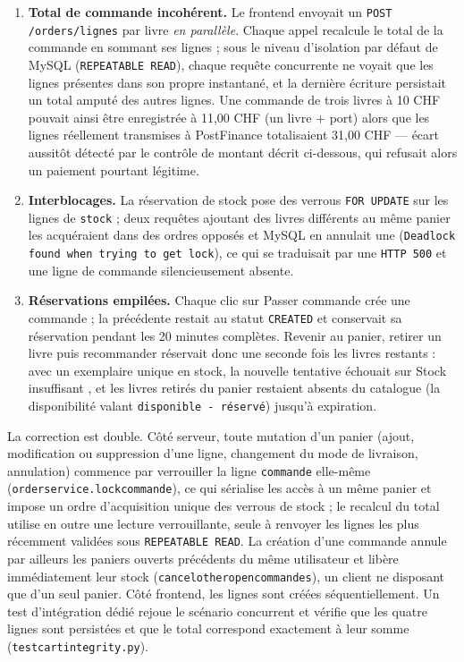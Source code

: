 \documentclass[12pt, a4paper]{report}
\renewcommand{\_}{\origunderscore\allowbreak}
\begin{document}
\begin{enumerate}
  \item \textbf{Total de commande incohérent.} Le frontend envoyait un \texttt{POST /orders/lignes} par livre \emph{en parallèle}. Chaque appel recalcule le total de la commande en sommant ses lignes ; sous le niveau d'isolation par défaut de MySQL (\texttt{REPEATABLE READ}), chaque requête concurrente ne voyait que les lignes présentes dans son propre instantané, et la dernière écriture persistait un total amputé des autres lignes. Une commande de trois livres à 10 CHF pouvait ainsi être enregistrée à 11,00 CHF (un livre + port) alors que les lignes réellement transmises à PostFinance totalisaient 31,00 CHF — écart aussitôt détecté par le contrôle de montant décrit ci-dessous, qui refusait alors un paiement pourtant légitime.
  \item \textbf{Interblocages.} La réservation de stock pose des verrous \texttt{FOR UPDATE} sur les lignes de \texttt{stock} ; deux requêtes ajoutant des livres différents au même panier les acquéraient dans des ordres opposés et MySQL en annulait une (\texttt{Deadlock found when trying to get lock}), ce qui se traduisait par une \texttt{HTTP 500} et une ligne de commande silencieusement absente.
  \item \textbf{Réservations empilées.} Chaque clic sur \og Passer commande \fg{} crée une commande ; la précédente restait au statut \texttt{CREATED} et conservait sa réservation pendant les 20 minutes complètes. Revenir au panier, retirer un livre puis recommander réservait donc une seconde fois les livres restants : avec un exemplaire unique en stock, la nouvelle tentative échouait sur \og Stock insuffisant \fg{}, et les livres retirés du panier restaient absents du catalogue (la disponibilité valant \texttt{disponible - réservé}) jusqu'à expiration.
\end{enumerate}

\noindent La correction est double. Côté serveur, toute mutation d'un panier (ajout, modification ou suppression d'une ligne, changement du mode de livraison, annulation) commence par verrouiller la ligne \texttt{commande} elle-même (\texttt{order\_service.lock\_commande}), ce qui sérialise les accès à un même panier et impose un ordre d'acquisition unique des verrous de stock ; le recalcul du total utilise en outre une lecture verrouillante, seule à renvoyer les lignes les plus récemment validées sous \texttt{REPEATABLE READ}. La création d'une commande annule par ailleurs les paniers ouverts précédents du même utilisateur et libère immédiatement leur stock (\texttt{cancel\_other\_open\_commandes}), un client ne disposant que d'un seul panier. Côté frontend, les lignes sont créées séquentiellement. Un test d'intégration dédié rejoue le scénario concurrent et vérifie que les quatre lignes sont persistées et que le total correspond exactement à leur somme (\texttt{test\_cart\_integrity.py}).
\end{document}
